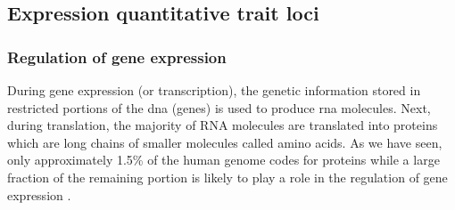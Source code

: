 \subsection{Expression quantitative trait loci}
\label{sec:eqtl}






\subsubsection{Regulation of gene expression}

During gene expression (or transcription), the genetic information stored in restricted portions of the \gls{dna} (genes) is used to produce 
\gls{rna} molecules. 
Next, during translation, the majority of RNA molecules are translated into  proteins 
which are
long chains of smaller molecules called amino acids. 
As we have seen, only approximately 1.5\% of the human genome codes for proteins \cite{lander2001initial} while a large fraction of the remaining portion is likely to play a role in the regulation of gene expression \cite{encode2004encode}. \\

